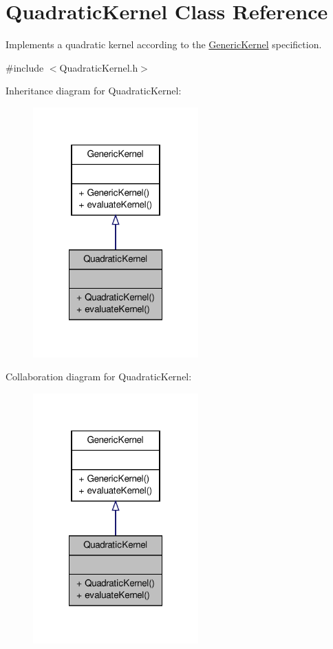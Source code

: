 \hypertarget{classQuadraticKernel}{\section{\-Quadratic\-Kernel \-Class \-Reference}
\label{classQuadraticKernel}
}


\-Implements a quadratic kernel according to the \hyperlink{classGenericKernel}{\-Generic\-Kernel} specifiction.  




{\ttfamily \#include $<$\-Quadratic\-Kernel.\-h$>$}



\-Inheritance diagram for \-Quadratic\-Kernel\-:\nopagebreak
\begin{figure}[H]
\begin{center}
\leavevmode
\includegraphics[width=180pt]{classQuadraticKernel__inherit__graph}
\end{center}
\end{figure}


\-Collaboration diagram for \-Quadratic\-Kernel\-:\nopagebreak
\begin{figure}[H]
\begin{center}
\leavevmode
\includegraphics[width=180pt]{classQuadraticKernel__coll__graph}
\end{center}
\end{figure}
